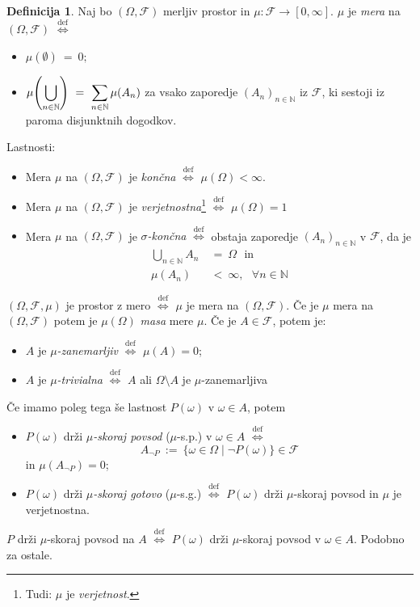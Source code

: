 \documentclass[11pt]{article}
\newcommand{\N}{\mathbb{N}}
\newcommand{\F}{\mathcal{F}}
\newcommand{\diff}{\overset{\text{def}}{\iff}}
\newcommand{\set}[1]{\{#1\}}
\newcommand{\oklepaj}[1]{\left(#1\right)}
\newcommand{\1}{\mathbbm{1}}
\theoremstyle{definition}
\newtheorem{definicija}{Definicija}[section]
\theoremstyle{definition}
\theoremstyle{definition}
\theoremstyle{definition}
\begin{document}
\begin{definicija}

Naj bo $(\Omega,\F)$ merljiv prostor in $\mu: \F \rightarrow [0,\infty]$. $\mu$ je \textit{mera} na $(\Omega,\F)$ $\diff$
\begin{itemize}
	\item $\mu(\emptyset) ~=~ 0;$
	\item $\mu\mathlarger{\oklepaj{\bigcup_{n\in\N}} ~=~ \sum_{n\in\N} \mu(A_n)}$ za vsako zaporedje $(A_n)_{n\in\N}$ iz $\F$, ki sestoji iz paroma disjunktnih dogodkov.
\end{itemize}
Lastnosti:
\begin{itemize}
	\item Mera $\mu$ na $(\Omega,\F)$ je \textit{končna} $\diff$ $\mu(\Omega)<\infty$.
	\item Mera $\mu$ na $(\Omega,\F)$ je \textit{verjetnostna}\footnote{Tudi: $\mu$ je \textit{verjetnost}.} $\diff$ $\mu(\Omega) = 1$
	
	\item Mera $\mu$ na $(\Omega,\F)$ je \textit{$\sigma$-končna} $\diff$ obstaja zaporedje $(A_n)_{n\in\N}$ v $\F$, da je
	\begin{align*}
	\bigcup_{n\in\N} A_n ~&=~ \Omega ~~~\text{in} \\
	\mu(A_n) ~&<~ \infty, ~~~\forall n \in \N
	\end{align*}
	
\end{itemize}
$(\Omega,\F,\mu)$ je prostor z mero $\diff$ $\mu$ je mera na $(\Omega,\F)$. Če je $\mu$ mera na $(\Omega,\F)$ potem je $\mu(\Omega)$ \textit{masa} mere $\mu$. Če je $A \in \F$, potem je:
\begin{itemize}
	\item $A$ je \textit{$\mu$-zanemarljiv} $\diff$ $\mu(A) = 0$;
	\item $A$ je \textit{$\mu$-trivialna} $\diff$ $A$ ali $\Omega\setminus A$ je $\mu$-zanemarljiva
\end{itemize}
Če imamo poleg tega še lastnost $P(\omega)$ v $\omega \in A$, potem
\begin{itemize}
	\item $P(\omega)$ drži \textit{$\mu$-skoraj povsod} ($\mu$-s.p.) v $\omega \in A$ $\diff$ 
	$$A_{\neg P} ~:=~ \set{\omega \in \Omega \mid \neg P(\omega)} \in \F$$ in $\mu(A_{\neg P}) = 0$;
	\item $P(\omega)$ drži \textit{$\mu$-skoraj gotovo} ($\mu$-s.g.) $\diff$ $P(\omega)$ drži $\mu$-skoraj povsod in $\mu$ je verjetnostna.
\end{itemize}
$P$ drži $\mu$-skoraj povsod na $A$ $\diff$ $P(\omega)$ drži $\mu$-skoraj povsod v $\omega \in A$. Podobno za ostale.

\end{definicija}
\vspace{0.5cm}
\end{document}
